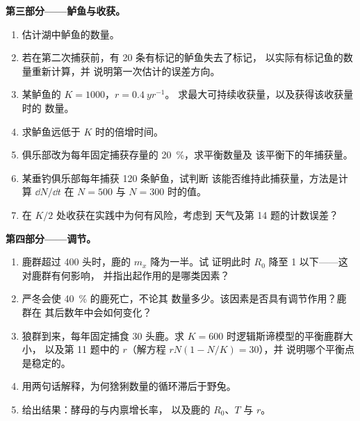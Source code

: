 \begin{problem}
\medskip
\noindent\textbf{第三部分——鲈鱼与收获。}
\begin{enumerate}[resume]
  \item 估计湖中鲈鱼的数量。
  \item 若在第二次捕获前，有 20 条有标记的鲈鱼失去了标记，
        以实际有标记鱼的数量重新计算，并
        说明第一次估计的误差方向。
  \item 某鲈鱼的 $K = 1000$，$r = \qty{0.4}{yr^{-1}}$。
        求最大可持续收获量，以及获得该收获量时的
        数量。
  \item 求鲈鱼远低于
        $K$ 时的倍增时间。
  \item 俱乐部改为每年固定捕获存量的
        \qty{20}{\%}，求平衡数量及
        该平衡下的年捕获量。
  \item 某垂钓俱乐部每年捕获 120 条鲈鱼，试判断
        该能否维持此捕获量，方法是计算 $\dd N/\dd t$ 在 $N =
        500$ 与 $N = 300$ 时的值。
  \item 在 $K/2$ 处收获在实践中为何有风险，考虑到
        天气及第 14 题的计数误差？
\end{enumerate}

\medskip
\noindent\textbf{第四部分——调节。}
\begin{enumerate}[resume]
  \item 鹿群超过 400 头时，鹿的 $m_x$ 降为一半。试
        证明此时 $R_0$ 降至 1 以下——这对鹿群有何影响，
        并指出起作用的是哪类因素？
  \item 严冬会使 \qty{40}{\%} 的鹿死亡，不论其
        数量多少。该因素是否具有调节作用？鹿群在
        其后数年中会如何变化？
  \item 狼群到来，每年固定捕食 30 头鹿。求
        $K = 600$ 时逻辑斯谛模型的平衡鹿群大小，
        以及第 11 题中的 $r$（解方程 $rN(1 - N/K) = 30$），并
        说明哪个平衡点是稳定的。
  \item 用两句话解释，为何猞猁数量的循环滞后于野兔。
  \item 给出结果：酵母的与内禀增长率，
        以及鹿的 $R_0$、$T$ 与 $r$。
\end{enumerate}
\end{problem}
